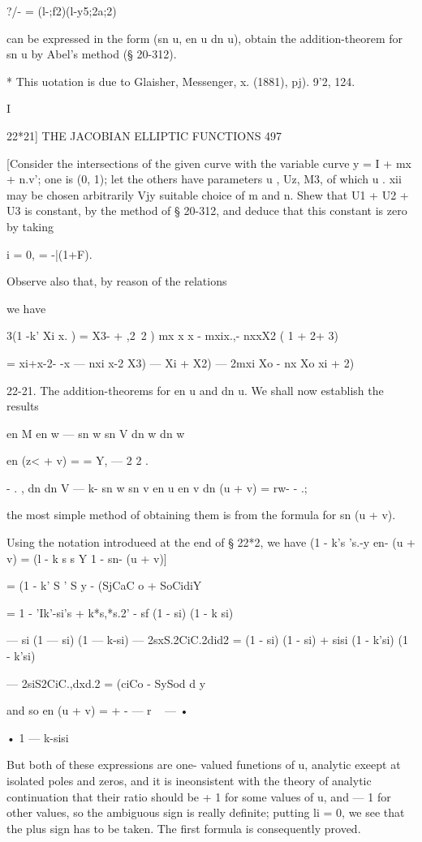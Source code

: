 ?/- = (l-;f2)(l-y5;2a;2)

can be expressed in the form (sn u, en u dn u), obtain the
addition-theorem for sn u by Abel's method (§ 20-312).

* This uotation is due to Glaisher, Messenger, x. (1881), pj). 9'2,
124.

I

22*21] THE JACOBIAN ELLIPTIC FUNCTIONS 497

[Consider the intersections of the given curve with the variable curve
y = I + mx + n.v'; one is (0, 1); let the others have parameters u ,
Uz, M3, of which u . xii may be chosen arbitrarily Vjy suitable choice
of m and n. Shew that U1 + U2 + U3 is constant, by the method of §
20-312, and deduce that this constant is zero by taking

 i = 0, = -|(1+F).

Observe also that, by reason of the relations

we have

 3(1 -k' Xi x. ) = X3- + ,2\ 2 ) mx x x - mxix.,- nxxX2 ( 1 + 2+ 3)

= xi+x-2- -x — nxi x-2 X3) — Xi + X2) — 2mxi Xo - nx Xo xi + 2)

22-21. The addition-theorems for en u and dn u. We shall now establish
the results

en M en w — sn w sn V dn w dn w

en (z< + v) = = Y, — 2 2 .

- . , dn dn V — k- sn w sn v en u en v dn (u + v) = rw- - .;

the most simple method of obtaining them is from the formula for sn (u
+ v).

Using the notation introdueed at the end of § 22*2, we have (1 - k's
's.-y en- (u + v) = (l - k s s Y 1 - sn- (u + v)]

= (1 - k' S ' S y - (SjCaC o + SoCidiY

= 1 - 'Ik'-si's + k*s,*s.2' - sf (1 - si) (1 - k si)

— si (1 — si) (1 — k-si) — 2sxS.2CiC.2did2 = (1 - si) (1 - si) + sisi
(1 - k'si) (1 - k'si)

— 2siS2CiC.,dxd.2 = (ciCo - SySod d y

and so en (u + v) = + - — r ~ — •

• 1 — k-sisi

But both of these expressions are one- valued funetions of u, analytic
exeept at isolated poles and zeros, and it is ineonsistent with the
theory of analytic continuation that their ratio should be + 1 for
some values of u, and — 1 for other values, so the ambiguous sign is
really definite; putting li = 0, we see that the plus sign has to be
taken. The first formula is consequently proved.

